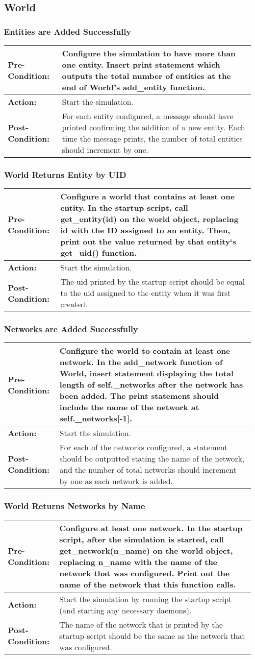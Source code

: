 \documentclass[titlepage]{article}
\newcommand{\testcase}[3]{
    \begin{center}
    \begin{tabular}{| l | p{0.7\textwidth}|}
        \hline
        \rowcolor[gray]{0.8}\textbf{Pre-Condition:} & #1 \\ \hline
        \textbf{Action:} & #2 \\ \hline
        \rowcolor[gray]{0.8}\textbf{Post-Condition:} & #3 \\ \hline
    \end{tabular}
    \end{center}
}
\begin{document}
\subsection{World}
\subsubsection{Entities are Added Successfully}
\testcase{Configure the simulation to have more than one entity.  Insert print statement which outputs the total number of entities at the end of World's add_entity function.}{Start the simulation.}{For each entity configured, a message should have printed confirming the addition of a new entity.  Each time the message prints, the number of total entities should increment by one.}

\subsubsection{World Returns Entity by UID}
\testcase{Configure a world that contains at least one entity. In the startup script, call get_entity(id) on the world object, replacing id with the ID assigned to an entity. Then, print out the value returned by that entity`s  get_uid() function.}{Start the simulation.}{The uid printed by the startup script should be equal to the uid assigned to the entity when it was first created.}

\subsubsection{Networks are Added Successfully}
\testcase{Configure the world to contain at least one network.  In the add_network function of World, insert statement displaying the total length of self._networks after the network has been added. The print statement should include the name of the network at self._networks[-1].}{Start the simulation.}{For each of the networks configured, a statement should be outputted stating the name of the network, and the number of total networks should increment by one as each network is added.}

\subsubsection{World Returns Networks by Name}
\testcase{Configure at least one network.  In the startup script, after the simulation is started, call get_network(n_name) on the world object, replacing n_name with the name of the network that was configured.  Print out the name of the network that this function calls.}{Start the simulation by running the startup script (and starting any necessary daemons).}{The name of the network that is printed by the startup script should be the same as the network that was configured.}
\end{document}
